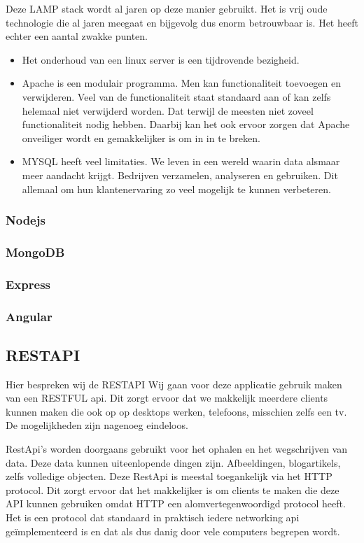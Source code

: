 \documentclass[a4paper,11pt]{article}
\begin{document}
Deze LAMP stack wordt al jaren op deze manier gebruikt. Het is vrij oude
technologie die al jaren meegaat en bijgevolg dus enorm betrouwbaar is. Het
heeft echter een aantal zwakke punten.

\begin{itemize}
  \item Het onderhoud van een linux server is een tijdrovende bezigheid.
  \item Apache is een modulair programma. Men kan functionaliteit toevoegen en
  verwijderen. Veel van de functionaliteit staat standaard aan of kan zelfs
  helemaal niet verwijderd worden. Dat terwijl de meesten niet zoveel
  functionaliteit nodig hebben. Daarbij kan het ook ervoor zorgen dat Apache
  onveiliger wordt en gemakkelijker is om in in te breken.
  \item MYSQL heeft veel limitaties. We leven in een wereld waarin data alsmaar
  meer aandacht krijgt. Bedrijven verzamelen, analyseren en gebruiken. Dit
  allemaal om hun klantenervaring zo veel mogelijk te kunnen verbeteren.
\end{itemize}

\subsubsection{Nodejs}

\subsubsection{MongoDB}

\subsubsection{Express}

\subsubsection{Angular}

\subsection{RESTAPI} %
Hier bespreken wij de RESTAPI
Wij gaan voor deze applicatie gebruik maken van een RESTFUL api. Dit zorgt
ervoor dat we makkelijk meerdere clients kunnen maken die ook op op desktops
werken, telefoons, misschien zelfs een tv. De mogelijkheden zijn nagenoeg
eindeloos.

RestApi's worden doorgaans gebruikt voor het ophalen en het wegschrijven van
data. Deze data kunnen uiteenlopende dingen zijn. Afbeeldingen, blogartikels,
zelfs volledige objecten. Deze RestApi is meestal toegankelijk via het HTTP
protocol. Dit zorgt ervoor dat het makkelijker is om clients te maken die deze
API kunnen gebruiken omdat HTTP een alomvertegenwoordigd protocol heeft. Het is
een protocol dat standaard in praktisch iedere networking api geïmplementeerd is
en dat als dus danig door vele computers begrepen wordt.
\end{document}
